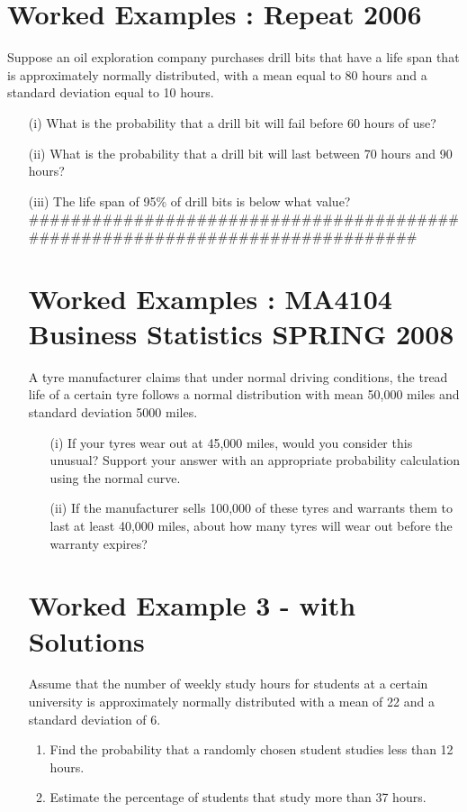 

\section{Worked Examples : Repeat 2006}
Suppose an oil exploration company purchases drill bits that have a life span that is approximately normally distributed, with a mean equal to 80 hours and a standard deviation equal to 10 hours.

\begin{itemize}
\item[(i)]What is the probability that a drill bit will fail before 60 hours of use?

\item[(ii)]What is the probability that a drill bit will last between 70 hours and 90 hours?

\item[(iii)]The life span of 95\% of drill bits is below what value?
##############################################################################


\section{Worked Examples : MA4104 Business Statistics SPRING 2008}

A tyre manufacturer claims that under normal driving conditions, the tread life of a certain tyre follows a normal distribution with mean 50,000 miles and standard deviation 5000 miles. 

\begin{itemize}
\item[(i)] If your tyres wear out at 45,000 miles, would you consider this unusual? Support your answer with an appropriate probability calculation using the normal curve. 

\item[(ii)] If the manufacturer sells 100,000 of these tyres and warrants them to last at least 40,000 miles, about how many tyres will wear out before the warranty expires? 
\end{itemize}
\section{Worked Example 3 - with Solutions}
Assume that the number of weekly study hours for students at a certain university
is approximately normally distributed with a mean of 22 and a standard deviation
of 6.
\begin{enumerate}
\item Find the probability that a randomly chosen student studies less than 12
hours.
\item Estimate the percentage of students that study more than 37 hours.
\end{enumerate}


\end{itemize}
